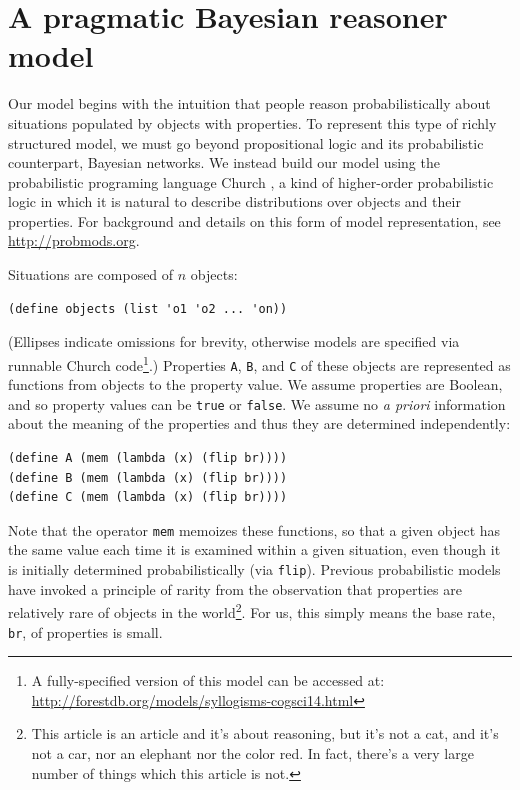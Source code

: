 \documentclass[10pt,letterpaper]{article}
\begin{document}
\section{A pragmatic Bayesian reasoner model}

Our model begins with the intuition that people reason probabilistically about situations populated by objects with properties. To represent this type of richly structured model, we must go beyond propositional logic and its probabilistic counterpart, Bayesian networks. We instead build our model using the probabilistic programing language Church \cite{Goodman2008}, a kind of higher-order probabilistic logic in which it is natural to describe distributions over objects and their properties. For background and details on this form of model representation, see \url{http://probmods.org}.

Situations are composed of $n$ objects:
\begin{lstlisting}
(define objects (list 'o1 'o2 ... 'on))
\end{lstlisting}
(Ellipses indicate omissions for brevity, otherwise models are specified via runnable Church code\footnote{A fully-specified version of this model can be accessed at: \url{http://forestdb.org/models/syllogisms-cogsci14.html}}.)
Properties \lstinline{A}, \lstinline{B}, and \lstinline{C} of these objects are represented as functions from objects to the property value. We assume properties are Boolean, and so property values can be \lstinline{true} or \lstinline{false}. We assume no \emph{a priori} information about the meaning of the properties and thus they are determined independently:
\begin{lstlisting}
(define A (mem (lambda (x) (flip br))))
(define B (mem (lambda (x) (flip br))))
(define C (mem (lambda (x) (flip br))))
\end{lstlisting}
Note that the operator \lstinline{mem} memoizes these functions, so that a given object has the same value each time it is examined within a given situation, even though it is initially determined probabilistically (via \lstinline{flip}). 
Previous probabilistic models \cite{Oaksford1994} have invoked a principle of rarity from the observation that properties are relatively rare of objects in the world\footnote{This article is an article and it's about reasoning, but it's not a cat, and it's not a car, nor an elephant nor the color red. In fact, there's a very large number of things which this article is not.}. For us, this simply means the base rate, \lstinline{br}, of properties is small.  
\end{document}
